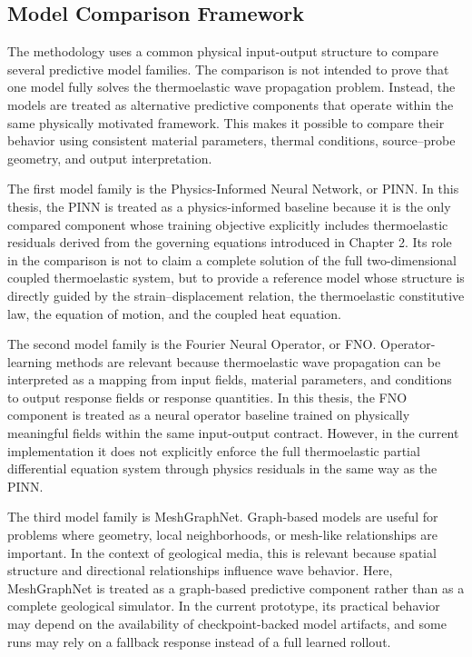 \subsection{Model Comparison Framework}

The methodology uses a common physical input-output structure to compare several predictive model families. The comparison is not intended to prove that one model fully solves the thermoelastic wave propagation problem. Instead, the models are treated as alternative predictive components that operate within the same physically motivated framework. This makes it possible to compare their behavior using consistent material parameters, thermal conditions, source--probe geometry, and output interpretation.

The first model family is the Physics-Informed Neural Network, or PINN. In this thesis, the PINN is treated as a physics-informed baseline because it is the only compared component whose training objective explicitly includes thermoelastic residuals derived from the governing equations introduced in Chapter 2. Its role in the comparison is not to claim a complete solution of the full two-dimensional coupled thermoelastic system, but to provide a reference model whose structure is directly guided by the strain--displacement relation, the thermoelastic constitutive law, the equation of motion, and the coupled heat equation.

The second model family is the Fourier Neural Operator, or FNO. Operator-learning methods are relevant because thermoelastic wave propagation can be interpreted as a mapping from input fields, material parameters, and conditions to output response fields or response quantities. In this thesis, the FNO component is treated as a neural operator baseline trained on physically meaningful fields within the same input-output contract. However, in the current implementation it does not explicitly enforce the full thermoelastic partial differential equation system through physics residuals in the same way as the PINN.

The third model family is MeshGraphNet. Graph-based models are useful for problems where geometry, local neighborhoods, or mesh-like relationships are important. In the context of geological media, this is relevant because spatial structure and directional relationships influence wave behavior. Here, MeshGraphNet is treated as a graph-based predictive component rather than as a complete geological simulator. In the current prototype, its practical behavior may depend on the availability of checkpoint-backed model artifacts, and some runs may rely on a fallback response instead of a full learned rollout.

